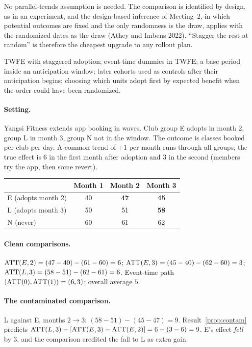 \documentclass[11pt]{article}
\begin{document}
No parallel-trends assumption is needed. The comparison is identified by design, as in an experiment, and the design-based inference of
Meeting~2, in which potential outcomes are fixed and the only randomness is the draw, applies with the randomized dates as the draw (Athey and
Imbens 2022). ``Stagger the rest at random'' is therefore the cheapest upgrade to any rollout plan.

\begin{pitfall}
TWFE with staggered adoption; event-time dummies in TWFE; a base period inside an anticipation window; later cohorts used as controls after their
anticipation begins; choosing which units adopt first by expected benefit when the order could have been randomized.
\end{pitfall}

\sectiontwo

\paragraph{Setting.} Yangsi Fitness extends app booking in waves. Club group E adopts in month 2, group L in month 3, group N not in the window. The outcome is
classes booked per club per day. A common trend of $+1$ per month runs through all groups; the true effect is $6$ in the first month after adoption and
$3$ in the second (members try the app, then some revert).
\begin{center}
\begin{tabular}{lccc}
\toprule
& Month 1 & Month 2 & Month 3 \\
\midrule
E (adopts month 2) & 40 & \textbf{47} & \textbf{45} \\
L (adopts month 3) & 50 & 51 & \textbf{58} \\
N (never) & 60 & 61 & 62 \\
\bottomrule
\end{tabular}
\end{center}

\paragraph{Clean comparisons.} $\text{ATT}(E,2) = (47 - 40) - (61 - 60) = 6$; $\text{ATT}(E,3) = (45 - 40) - (62 - 60) = 3$; $\text{ATT}(L,3) = (58 - 51) - (62 - 61) = 6$. Event-time path
$(\text{ATT}(0), \text{ATT}(1)) = (6, 3)$; overall average $5$.

\paragraph{The contaminated comparison.} L against E, months $2 \to 3$: $(58 - 51) - (45 - 47) = 9$. Result~\ref{prop:contam} predicts
$\text{ATT}(L,3) - [\text{ATT}(E,3) - \text{ATT}(E,2)] = 6 - (3 - 6) = 9$. E's effect \emph{fell} by $3$, and the comparison credited the fall to L as extra gain.
\end{document}
